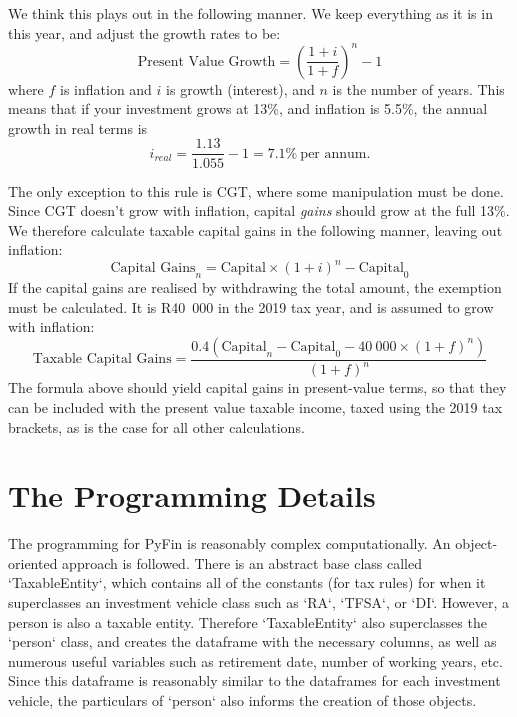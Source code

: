 \documentclass[a4paper, justified]{tufte-handout}
\begin{document}
We think this plays out in the following manner. We keep everything as it is in this year, and adjust the growth rates to be:
\begin{equation}
\textrm{Present Value Growth} = \left(\frac{1+i}{1+f}\right)^n - 1
\end{equation}
where $f$ is inflation and $i$ is growth (interest), and $n$ is the number of years. This means that if your investment grows at 13\%, and inflation is 5.5\%, the annual growth in real terms is 
\begin{equation}
i_{real} = \frac{1.13}{1.055} - 1=7.1\%~\textrm{per annum.}
\end{equation}

The only exception to this rule is CGT, where some manipulation must be done. Since CGT doesn't grow with inflation, capital \textit{gains} should grow at the full 13\%. We therefore calculate taxable capital gains in the following manner, leaving out inflation:
\begin{equation}
\textrm{Capital Gains}_{n} = \textrm{Capital}\times(1+i)^{n} - \textrm{Capital}_0
\end{equation}
If the capital gains are realised by withdrawing the total amount, the exemption must be calculated. It is R40~000 in the 2019 tax year, and is assumed to grow with inflation:
\begin{equation}
\textrm{Taxable Capital Gains} = \frac{0.4\left(\textrm{Capital}_{n} - \textrm{Capital}_{0} - 40~000\times(1+f)^{n}\right)}{(1+f)^n}
\end{equation}
The formula above should yield capital gains in present-value terms, so that they can be included with the present value taxable income, taxed using the 2019 tax brackets, as is the case for all other calculations.

\newpage
\section{The Programming Details}
The programming for PyFin is reasonably complex computationally. An object-oriented approach is followed. There is an abstract base class called `TaxableEntity`, which contains all of the constants (for tax rules) for when it superclasses an investment vehicle class such as `RA`, `TFSA`, or `DI`. However, a person is also a taxable entity. Therefore `TaxableEntity` also superclasses the `person` class, and creates the dataframe with the necessary columns, as well as numerous useful variables such as retirement date, number of working years, etc. Since this dataframe is reasonably similar to the dataframes for each investment vehicle, the particulars of `person` also informs the creation of those objects.
\end{document}
